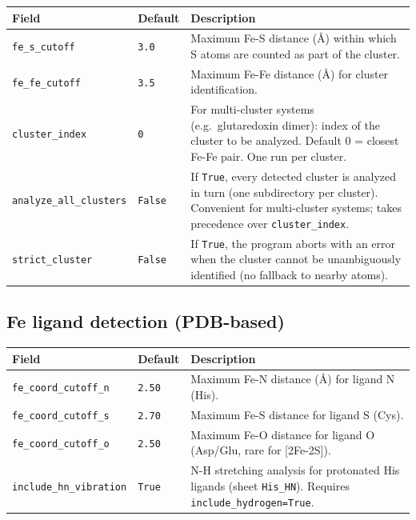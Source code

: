 \documentclass[11pt,a4paper,twoside]{article}
\theoremstyle{remark}
\begin{document}
\begin{longtable}{p{} p{} p{}}
\toprule
\textbf{Field} & \textbf{Default} & \textbf{Description} \\
\midrule
\endhead
\texttt{fe\_s\_cutoff}  & \texttt{3.0} & Maximum Fe-S distance
  (\AA{}) within which S atoms are counted as part of the
  cluster. \\
\texttt{fe\_fe\_cutoff} & \texttt{3.5} & Maximum Fe-Fe distance
  (\AA{}) for cluster identification. \\
\texttt{cluster\_index} & \texttt{0}   & For multi-cluster systems
  (e.g.\ glutaredoxin dimer): index of the cluster to be
  analyzed. Default 0 = closest Fe-Fe pair. One run per cluster. \\
\texttt{analyze\_all\_clusters} & \texttt{False} & If \texttt{True},
  every detected cluster is analyzed in turn (one subdirectory per
  cluster). Convenient for multi-cluster systems; takes precedence
  over \texttt{cluster\_index}. \\
\texttt{strict\_cluster} & \texttt{False} & If \texttt{True}, the
  program aborts with an error when the cluster cannot be
  unambiguously identified (no fallback to nearby atoms). \\
\bottomrule
\end{longtable}

\subsection{Fe ligand detection (PDB-based)}

\begin{longtable}{p{} p{} p{}}
\toprule
\textbf{Field} & \textbf{Default} & \textbf{Description} \\
\midrule
\endhead
\texttt{fe\_coord\_cutoff\_n} & \texttt{2.50} & Maximum Fe-N
  distance (\AA{}) for ligand N (His). \\
\texttt{fe\_coord\_cutoff\_s} & \texttt{2.70} & Maximum Fe-S
  distance for ligand S (Cys). \\
\texttt{fe\_coord\_cutoff\_o} & \texttt{2.50} & Maximum Fe-O
  distance for ligand O (Asp/Glu, rare for [2Fe-2S]). \\
\texttt{include\_hn\_vibration} & \texttt{True} & N-H stretching
  analysis for protonated His ligands (sheet \texttt{His\_HN}).
  Requires \texttt{include\_hydrogen=True}. \\
\bottomrule
\end{longtable}
\end{document}
